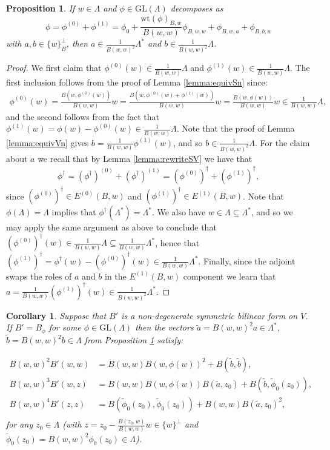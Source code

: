 \documentclass{amsart}
\theoremstyle{plain}
\newtheorem{corollary}[theorem]{Corollary}
\newtheorem{propn}[theorem]{Proposition}
\theoremstyle{definition}
\begin{document}
\begin{propn}
\label{propn:decomp}
If $w\in\Lambda$ and $\phi\in \mathrm{GL}(\Lambda)$ decomposes as \[\phi = \phi^{(0)} + \phi^{(1)} = \phi_0 + \frac{\text{wt}(\phi)_{B,w}}{B(w,w)}\phi_{B,w,w} + \phi_{B,w,a}+\phi_{B,b,w}\] with $a,b\in\{w\}_B^{\perp}$, then $a\in \frac{1}{B(w,w)^2}\Lambda^*$ and $b\in \frac{1}{B(w,w)^2}\Lambda$.
\end{propn}

\begin{proof}
We first claim that $\phi^{(0)}(w)\in\frac{1}{B(w,w)}\Lambda$ and $\phi^{(1)}(w)\in\frac{1}{B(w,w)}\Lambda$. The first inclusion follows from the proof of Lemma \ref{lemma:equivSn} since: \begin{align*}\phi^{(0)}(w) = \frac{B(w,\phi^{(0)}(w))}{B(w,w)}w =  \frac{B(w,\phi^{(0)}(w)+\phi^{(1)}(w))}{B(w,w)}w = \frac{B(w,\phi(w))}{B(w,w)}w \in \frac{1}{B(w,w)}\Lambda,\end{align*} and the second follows from the fact that $\phi^{(1)}(w) = \phi(w) - \phi^{(0)}(w)\in\frac{1}{B(w,w)}\Lambda$. Note that the proof of Lemma \ref{lemma:equivVn} gives $b = \frac{1}{B(w,w)}\phi^{(1)}(w)$, and so $b\in\frac{1}{B(w,w)^2}\Lambda$. For the claim about $a$ we recall that by Lemma \ref{lemma:rewriteSV} we have that
\begin{align*}
    \phi^\dagger = (\phi^\dagger)^{(0)} + (\phi^\dagger)^{(1)} = (\phi^{(0)})^{\dagger} + (\phi^{(1)})^{\dagger},
\end{align*} since $(\phi^{(0)})^{\dagger}\in E^{(0)}(B,w)$ and $(\phi^{(1)})^{\dagger}\in E^{(1)}(B,w)$.
Note that $\phi(\Lambda) = \Lambda$ implies that $\phi^{\dagger}(\Lambda^*) = \Lambda^*$. We also have $w\in\Lambda\subseteq\Lambda^*$, and so we may apply the same argument as above to conclude that $(\phi^{(0)})^{\dagger}(w)\in\frac{1}{B(w,w)}\Lambda\subseteq\frac{1}{B(w,w)}\Lambda^*$, hence that $(\phi^{(1)})^{\dagger} = \phi^{\dagger}(w) - (\phi^{(0)})^{\dagger}(w) \in\frac{1}{B(w,w)}\Lambda^*$. Finally, since the adjoint swaps the roles of $a$ and $b$ in the $E^{(1)}(B,w)$ component we learn that $a = \frac{1}{B(w,w)}(\phi^{(1)})^{\dagger}(w)\in\frac{1}{B(w,w)^2}\Lambda^*$.
\end{proof}

\begin{corollary}
\label{cor:quadform}
Suppose that $B'$ is a non-degenerate symmetric bilinear form on $V$. If $B' = B_{\phi}$ for some $\phi\in\text{GL}(\Lambda)$ then the vectors $\tilde{a} = B(w,w)^2a\in\Lambda^*$, $\tilde{b} = B(w,w)^2b\in\Lambda$ from Proposition \ref{propn:decomp} satisfy:

\begin{align*}
B(w,w)^2B'(w,w) &= B(w,w)B(w,\phi(w))^2 +B(\tilde{b},\tilde{b}),\\
B(w,w)^3B'(w,z) &= B(w,w)B(w,\phi(w))B(\tilde{a},z_0) + B(\tilde{b}, \tilde{\phi}_0(z_0)),\\
B(w,w)^4B'(z,z) &= B(\tilde{\phi}_0(z_0), \tilde{\phi}_0(z_0))+B(w,w)B(\tilde{a},z_0)^2,\\
%
\end{align*} 
for any $z_0\in\Lambda$ (with $z = z_0 - \frac{B(z_0,w)}{B(w,w)}w\in \{w\}^{\perp}$ and $\tilde{\phi}_0(z_0) = B(w,w)^2\phi_0(z_0)\in\Lambda$).
\end{corollary}
\end{document}
